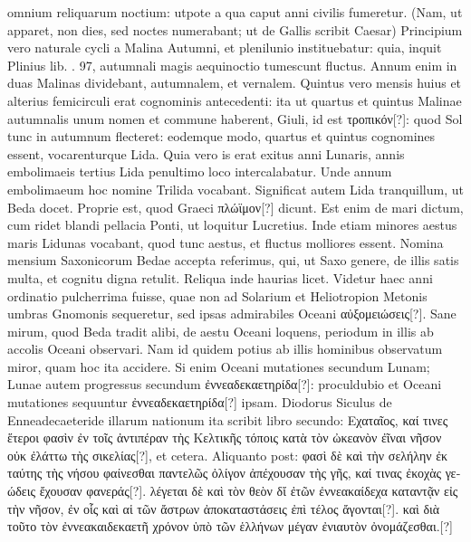omnium reliquarum noctium: utpote a qua caput anni civilis fumeretur.
(Nam, ut apparet, non dies, sed noctes numerabant; ut
de Gallis scribit Caesar) Principium vero naturale cycli a Malina
Autumni, et plenilunio instituebatur: quia, inquit Plinius lib. . 97,
autumnali magis aequinoctio tumescunt fluctus.
Annum enim in
duas Malinas dividebant, autumnalem, et vernalem.
Quintus vero
mensis huius et alterius femicirculi erat cognominis antecedenti: ita
ut quartus et quintus Malinae autumnalis unum nomen et commune
haberent, Giuli, id est \textgreek{τροπικόν[?]}: quod Sol tunc in autumnum
flecteret: eodemque modo, quartus et quintus cognomines essent,
vocarenturque Lida.
Quia vero is erat exitus anni Lunaris, annis embolimaeis
tertius Lida penultimo loco intercalabatur.
Unde annum
embolimaeum hoc nomine Trilida vocabant.
Significat autem Lida
tranquillum, ut Beda docet.
Proprie est, quod Graeci \textgreek{πλώϊμον[?]} dicunt.
Est enim de mari dictum, cum ridet blandi pellacia Ponti, ut loquitur
Lucretius.
Inde etiam minores aestus maris Lidunas vocabant, quod
tunc aestus, et fluctus molliores essent.
Nomina mensium Saxonicorum
Bedae accepta referimus, qui, ut Saxo genere, de illis satis multa,
et cognitu digna retulit.
Reliqua inde haurias licet.
Videtur
haec anni ordinatio pulcherrima fuisse, quae non ad Solarium et Heliotropion
Metonis umbras Gnomonis sequeretur, sed ipsas admirabiles
Oceani \textgreek{αὐξομειώσεις[?]}.
Sane mirum, quod Beda tradit alibi,
de aestu Oceani loquens, periodum  in illis ab accolis
Oceani observari.
Nam id quidem potius ab illis hominibus
observatum miror, quam hoc ita accidere.
Si enim Oceani mutationes
secundum Lunam; Lunae autem progressus secundum \textgreek{ἐννεαδεκαετηρίδα[?]}:
proculdubio et Oceani mutationes sequuntur \textgreek{ἐννεαδεκαετηρίδα[?]}
ipsam.
Diodorus Siculus de Enneadecaeteride illarum
nationum ita scribit libro secundo: \textgreek{Εχαταῖος, καί τινες ἕτεροι φασὶν ἐν
τοῖς ἀντιπέραν τὴς Κελτικῆς τόποις κατὰ τὸν ὠκεανὸν ἐῖναι νῆσον οὐκ ἐλάττω
 τὴς σικελίας[?]},
et cetera.
Aliquanto post:
 \textgreek{φασὶ δὲ καὶ τὴν σελήλην ἐκ ταύτης τὴς νήσου φαίνεσθαι
παντελῶς ὀλίγον ἀπέχουσαν τὴς γῆς, καί τινας ἐκοχὰς γεώδεις ἔχουσαν φανεράς[?]}.
\textgreek{λέγεται δὲ καὶ τὸν θεὸν δἴ ἐτῶν ἐννεακαίδεχα καταντᾷν
 εἰς τὴν νῆσον, ἐν οἷς
καὶ αἱ τῶν ἄστρων ἀποκαταστάσεις ἐπὶ τέλος ἄγονται[?]}.
\textgreek{καὶ διὰ τοῦτο τὸν ἐννεακαιδεκαετῆ
χρόνον ὑπὸ τῶν ἑλλήνων μέγαν ἐνιαυτὸν ὀνομάζεσθαι.[?]}
